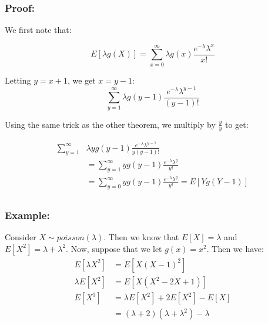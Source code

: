 \documentclass{article}
\begin{document}
\subsubsection*{Proof:}

We first note that:

\begin{equation*}
    E[\lambda g(X)] = \sum_{x=0}^\infty \lambda g(x) \frac{e^{-\lambda}\lambda^x}{x!}
\end{equation*}

Letting $y = x+1$, we get $x = y-1$:
\begin{equation*}
    \sum_{y=1}^\infty \lambda g(y-1) \frac{e^{-\lambda}\lambda^{y-1}}{(y-1)!}
\end{equation*}

Using the same trick as the other theorem, we multiply by $\frac{y}{y}$ to get:

\begin{equation*}
    \begin{split}
        \sum_{y=1}^\infty &\lambda y g(y-1) \frac{e^{-\lambda} \lambda^{y-1}}{y(y-1)!}\\
        &= \sum_{y=1}^\infty y g(y-1) \frac{e^{-\lambda} \lambda^{y}}{y!}\\
        &= \sum_{y=0}^\infty y g(y-1) \frac{e^{-\lambda} \lambda^{y}}{y!} = E[Yg(Y-1)]\\
    \end{split}
\end{equation*}

\subsubsection*{Example:}

Consider $X \sim poisson(\lambda)$. Then we know that $E[X] = \lambda$ and $E[X^2] = \lambda + \lambda^2$. Now, suppose that we let $g(x) = x^2$. Then we have:
\begin{equation*}
    \begin{split}
        E[\lambda X^2] &= E[X(X-1)^2]\\
        \lambda E[X^2] &= E[X(X^2-2X+1)]\\
        E[X^3] &= \lambda E[X^2] + 2E[X^2] - E[X]\\
        &= (\lambda + 2) (\lambda + \lambda^2) - \lambda
    \end{split}
\end{equation*}
\end{document}
